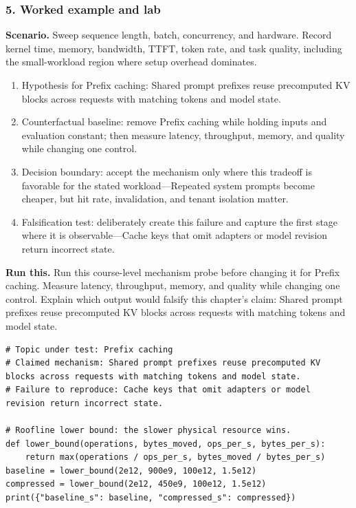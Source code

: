 \subsubsection*{5. Worked example and lab}
\textbf{Scenario.} Sweep sequence length, batch, concurrency, and hardware. Record kernel time, memory, bandwidth, TTFT, token rate, and task quality, including the small-workload region where setup overhead dominates.
\begin{enumerate}
\item Hypothesis for Prefix caching: Shared prompt prefixes reuse precomputed KV blocks across requests with matching tokens and model state.
\item Counterfactual baseline: remove Prefix caching while holding inputs and evaluation constant; then measure latency, throughput, memory, and quality while changing one control.
\item Decision boundary: accept the mechanism only where this tradeoff is favorable for the stated workload—Repeated system prompts become cheaper, but hit rate, invalidation, and tenant isolation matter.
\item Falsification test: deliberately create this failure and capture the first stage where it is observable—Cache keys that omit adapters or model revision return incorrect state.
\end{enumerate}
\textbf{Run this.} Run this course-level mechanism probe before changing it for Prefix caching. Measure latency, throughput, memory, and quality while changing one control. Explain which output would falsify this chapter's claim: Shared prompt prefixes reuse precomputed KV blocks across requests with matching tokens and model state.
\begin{Verbatim}[fontsize=\scriptsize]
# Topic under test: Prefix caching
# Claimed mechanism: Shared prompt prefixes reuse precomputed KV blocks across requests with matching tokens and model state.
# Failure to reproduce: Cache keys that omit adapters or model revision return incorrect state.

# Roofline lower bound: the slower physical resource wins.
def lower_bound(operations, bytes_moved, ops_per_s, bytes_per_s):
    return max(operations / ops_per_s, bytes_moved / bytes_per_s)
baseline = lower_bound(2e12, 900e9, 100e12, 1.5e12)
compressed = lower_bound(2e12, 450e9, 100e12, 1.5e12)
print({"baseline_s": baseline, "compressed_s": compressed})
\end{Verbatim}
